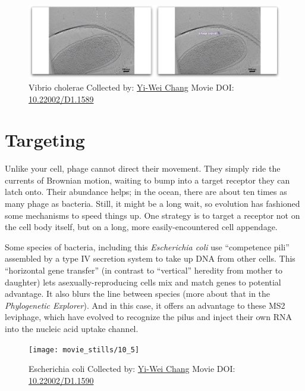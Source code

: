 \documentclass[]{tufte-book}
\begin{document}
\begin{figure}
\includegraphics{movie_stills/10_4} \caption[Vibrio cholerae Collected by:
\protect\hyperlink{yi-wei_chang}{Yi-Wei Chang} Movie DOI:
\href{https://doi.org/10.22002/D1.1589}{10.22002/D1.1589}]{Vibrio cholerae Collected by:
\protect\hyperlink{yi-wei_chang}{Yi-Wei Chang} Movie DOI:
\href{https://doi.org/10.22002/D1.1589}{10.22002/D1.1589}}\label{fig:10-4}
\end{figure}

\section{Targeting}\label{targeting}

Unlike your cell, phage cannot direct their movement. They simply ride
the currents of Brownian motion, waiting to bump into a target receptor
they can latch onto. Their abundance helps; in the ocean, there are
about ten times as many phage as bacteria. Still, it might be a long
wait, so evolution has fashioned some mechanisms to speed things up. One
strategy is to target a receptor not on the cell body itself, but on a
long, more easily-encountered cell appendage.

Some species of bacteria, including this \emph{Escherichia coli} use
``competence pili'' assembled by a type IV secretion system to take up
DNA from other cells. This ``horizontal gene transfer'' (in contrast to
``vertical'' heredity from mother to daughter) lets
asexually-reproducing cells mix and match genes to potential advantage.
It also blurs the line between species (more about that in the
\emph{Phylogenetic Explorer}). And in this case, it offers an advantage
to these MS2 leviphage, which have evolved to recognize the pilus and
inject their own RNA into the nucleic acid uptake channel.





\begin{figure}
\texttt{[image: movie\_stills/10\_5]} \caption[Escherichia coli Collected by:
\protect\hyperlink{yi-wei_chang}{Yi-Wei Chang} Movie DOI:
\href{https://doi.org/10.22002/D1.1590}{10.22002/D1.1590}]{Escherichia coli Collected by:
\protect\hyperlink{yi-wei_chang}{Yi-Wei Chang} Movie DOI:
\href{https://doi.org/10.22002/D1.1590}{10.22002/D1.1590}}\label{fig:10-5}
\end{figure}
\end{document}
